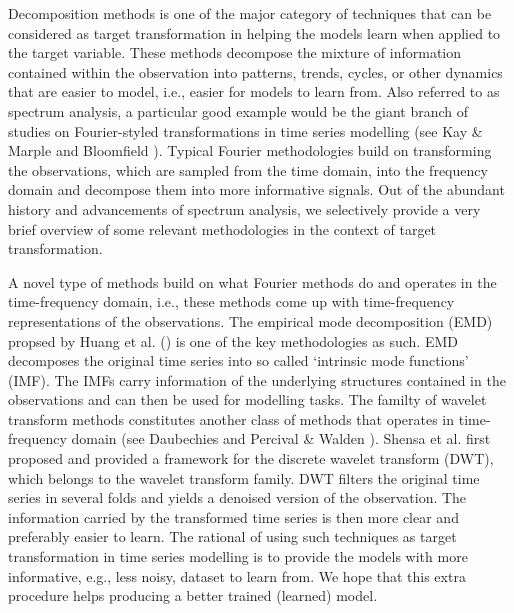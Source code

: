Decomposition methods is one of the major category of techniques that can be considered as target transformation in helping the models learn when applied to the target variable. These methods decompose the mixture of information contained within the observation into patterns, trends, cycles, or other dynamics that are easier to model, i.e., easier for models to learn from. Also referred to as spectrum analysis, a particular good example would be the giant branch of studies on Fourier-styled transformations in time series modelling (see Kay \& Marple \citeyear{kay1981spectrum} and Bloomfield \citeyear{bloomfield2004fourier}). Typical Fourier methodologies build on transforming the observations, which are sampled from the time domain, into the frequency domain and decompose them into more informative signals. Out of the abundant history and advancements of spectrum analysis, we selectively provide a very brief overview of some relevant methodologies in the context of target transformation.

A novel type of methods build on what Fourier methods do and operates in the time-frequency domain, i.e., these methods come up with time-frequency representations of the observations. The empirical mode decomposition (EMD) propsed by Huang et al. (\citeyear{huang1998empirical}) is one of the key methodologies as such. EMD decomposes the original time series into so called `intrinsic mode functions' (IMF). The IMFs carry information of the underlying structures contained in the observations and can then be used for modelling tasks. The familty of wavelet transform methods constitutes another class of methods that operates in time-frequency domain (see Daubechies \citeyear{daubechies1992ten} and Percival \& Walden \citeyear{percival2000wavelet}). Shensa et al. \citeyear{shensa1992discrete} first proposed and provided a framework for the discrete wavelet transform (DWT), which belongs to the wavelet transform family. DWT filters the original time series in several folds and yields a denoised version of the observation. The information carried by the transformed time series is then more clear and preferably easier to learn. The rational of using such techniques as target transformation in time series modelling is to provide the models with more informative, e.g., less noisy, dataset to learn from. We hope that this extra procedure helps producing a better trained (learned) model.

